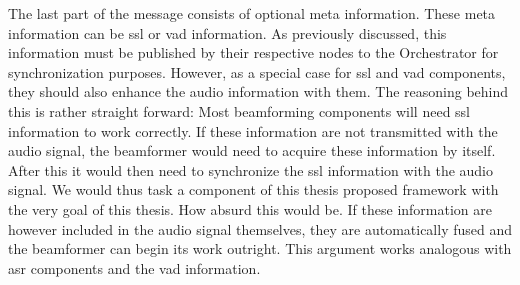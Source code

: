 The last part of the message consists of optional meta information.
These meta information can be \gls{ssl} or \gls{vad} information.
As previously discussed, this information must be published by their respective nodes to the Orchestrator for synchronization purposes.
However, as a special case for \gls{ssl} and \gls{vad} components, they should also enhance the audio information with them.
The reasoning behind this is rather straight forward:
Most beamforming components will need \gls{ssl} information to work correctly.
If these information are not transmitted with the audio signal, the beamformer would need to acquire these information by itself.
After this it would then need to synchronize the \gls{ssl} information with the audio signal.
We would thus task a component of this thesis proposed framework with the very goal of this thesis.
How absurd this would be.
If these information are however included in the audio signal themselves, they are automatically fused and the beamformer can begin its work outright.
This argument works analogous with \gls{asr} components and the \gls{vad} information.


